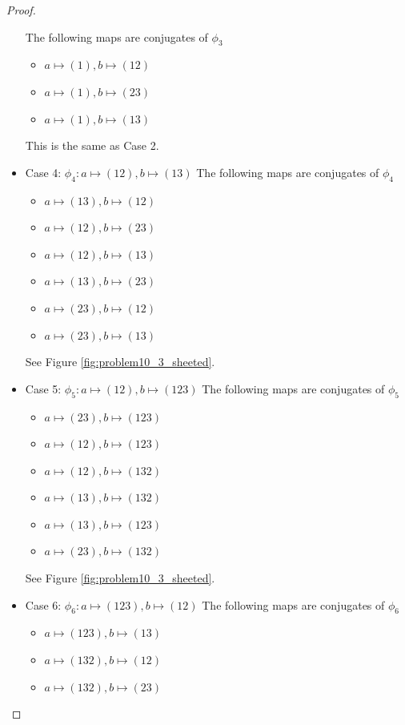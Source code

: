 \documentclass[12pt, psamsfonts]{amsart}
\theoremstyle{definition}
\theoremstyle{remark}
\numberwithin{equation}{section}
\begin{document}
\begin{proof}
\begin{itemize}
      The following maps are conjugates of $\phi_{3}$
      \begin{itemize}
        \item $a \mapsto (1), b \mapsto (12)$
        \item $a \mapsto (1), b \mapsto (23)$
        \item $a \mapsto (1), b \mapsto (13)$
      \end{itemize}
      This is the same as Case 2.
    \item Case 4: $\phi_{4}: a \mapsto (12), b \mapsto (13)$
      The following maps are conjugates of $\phi_{4}$
      \begin{itemize}
        \item $a \mapsto (13), b \mapsto (12)$
        \item $a \mapsto (12), b \mapsto (23)$
        \item $a \mapsto (12), b \mapsto (13)$
        \item $a \mapsto (13), b \mapsto (23)$
        \item $a \mapsto (23), b \mapsto (12)$
        \item $a \mapsto (23), b \mapsto (13)$
      \end{itemize}
      See Figure \ref{fig:problem10_3_sheeted}.
    \item Case 5: $\phi_{5}: a \mapsto (12), b \mapsto (123)$
      The following maps are conjugates of $\phi_{5}$
      \begin{itemize}
        \item $a \mapsto (23), b \mapsto (123)$
        \item $a \mapsto (12), b \mapsto (123)$
        \item $a \mapsto (12), b \mapsto (132)$
        \item $a \mapsto (13), b \mapsto (132)$
        \item $a \mapsto (13), b \mapsto (123)$
        \item $a \mapsto (23), b \mapsto (132)$
      \end{itemize}
      See Figure \ref{fig:problem10_3_sheeted}.
    \item Case 6: $\phi_{6}: a \mapsto (123), b \mapsto (12)$
      The following maps are conjugates of $\phi_{6}$
      \begin{itemize}
        \item $a \mapsto (123), b \mapsto (13)$
        \item $a \mapsto (132), b \mapsto (12)$
        \item $a \mapsto (132), b \mapsto (23)$

\end{itemize}
\end{itemize}
\end{proof}
\end{document}
